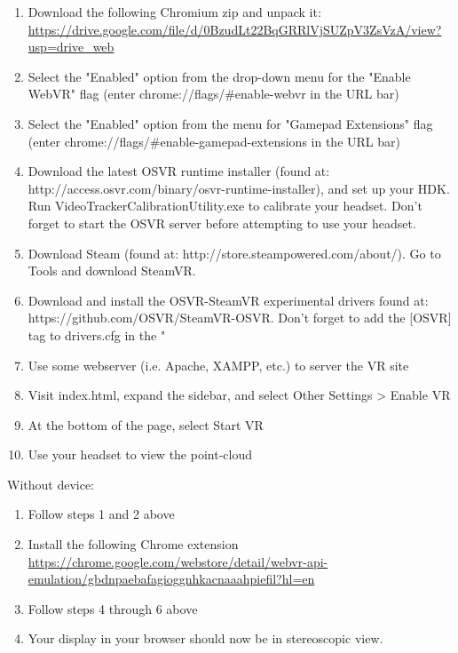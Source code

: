 \documentclass[draftclsnofoot,onecolumn]{IEEEtran}
\begin{document}
\begin{enumerate}
    \item Download the following Chromium zip and unpack it:\\
        \url{https://drive.google.com/file/d/0BzudLt22BqGRRlVjSUZpV3ZsVzA/view?usp=drive_web}
  \item Select the "Enabled" option from the drop-down menu for the "Enable WebVR" flag (enter chrome://flags/\#enable-webvr in the URL bar)
  \item Select the "Enabled" option from the menu for "Gamepad Extensions" flag (enter chrome://flags/\#enable-gamepad-extensions in the URL bar)
  \item Download the latest OSVR runtime installer (found at: http://access.osvr.com/binary/osvr-runtime-installer), and set up your HDK. Run VideoTrackerCalibrationUtility.exe to calibrate your headset. Don't forget to start the OSVR server before attempting to use your headset.
  \item Download Steam (found at: http://store.steampowered.com/about/). Go to Tools and download SteamVR.
  \item Download and install the OSVR-SteamVR experimental drivers found at: https://github.com/OSVR/SteamVR-OSVR. Don't forget to add the [OSVR] tag to drivers.cfg in the "%
  \item Use some webserver (i.e. Apache, XAMPP, etc.) to server the VR site
  \item Visit index.html, expand the sidebar, and select Other Settings > Enable VR
  \item At the bottom of the page, select Start VR
  \item Use your headset to view the point-cloud
\end{enumerate}

Without device:

\begin{enumerate}
  \item Follow steps 1 and 2 above
  \item Install the following Chrome extension\\
      \url{https://chrome.google.com/webstore/detail/webvr-api-emulation/gbdnpaebafagioggnhkacnaaahpiefil?hl=en}
  \item Follow steps 4 through 6 above
  \item Your display in your browser should now be in stereoscopic view.
\end{enumerate}
\end{document}
